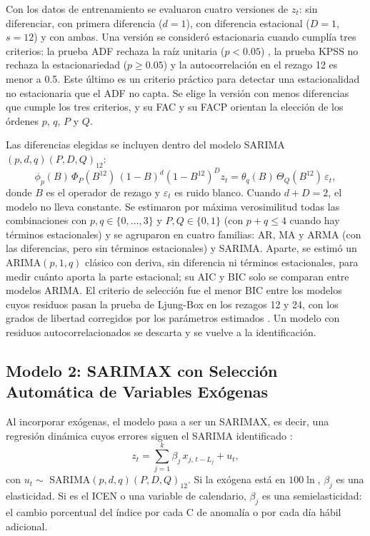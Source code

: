 \documentclass[conference]{IEEEtran}
\begin{document}
Con los datos de entrenamiento se evaluaron cuatro versiones de $z_t$: sin diferenciar, con primera diferencia ($d=1$), con diferencia estacional ($D=1$, $s=12$) y con ambas. Una versión se consideró estacionaria cuando cumplía tres criterios: la prueba ADF rechaza la raíz unitaria ($p<0.05$) \cite{dickey1979}, la prueba KPSS no rechaza la estacionariedad ($p\geq0.05$) \cite{kpss1992} y la autocorrelación en el rezago 12 es menor a 0.5. Este último es un criterio práctico para detectar una estacionalidad no estacionaria que el ADF no capta. Se elige la versión con menos diferencias que cumple los tres criterios, y su FAC y su FACP orientan la elección de los órdenes $p$, $q$, $P$ y $Q$.

Las diferencias elegidas se incluyen dentro del modelo SARIMA$(p,d,q)(P,D,Q)_{12}$:
\begin{equation}
\phi_p(B)\,\Phi_P(B^{12})\,(1-B)^{d}(1-B^{12})^{D} z_t = \theta_q(B)\,\Theta_Q(B^{12})\,\varepsilon_t,
\label{eq:sarima}
\end{equation}
donde $B$ es el operador de rezago y $\varepsilon_t$ es ruido blanco. Cuando $d+D=2$, el modelo no lleva constante. Se estimaron por máxima verosimilitud todas las combinaciones con $p,q\in\{0,\dots,3\}$ y $P,Q\in\{0,1\}$ (con $p+q\leq4$ cuando hay términos estacionales) y se agruparon en cuatro familias: AR, MA y ARMA (con las diferencias, pero sin términos estacionales) y SARIMA. Aparte, se estimó un ARIMA$(p,1,q)$ clásico con deriva, sin diferencia ni términos estacionales, para medir cuánto aporta la parte estacional; su AIC y BIC solo se comparan entre modelos ARIMA. El criterio de selección fue el menor BIC entre los modelos cuyos residuos pasan la prueba de Ljung-Box en los rezagos 12 y 24, con los grados de libertad corregidos por los parámetros estimados \cite{ljungbox1978}. Un modelo con residuos autocorrelacionados se descarta y se vuelve a la identificación.

\subsection{Modelo 2: SARIMAX con Selección Automática de Variables Exógenas}

Al incorporar exógenas, el modelo pasa a ser un SARIMAX, es decir, una regresión dinámica cuyos errores siguen el SARIMA identificado \cite{box2015,hyndman2021}:
\begin{equation}
z_t = \sum_{j=1}^{k} \beta_j\, x_{j,\,t-L_j} + u_t,
\label{eq:sarimax}
\end{equation}
con $u_t \sim$ SARIMA$(p,d,q)(P,D,Q)_{12}$. Si la exógena está en $100\ln$, $\beta_j$ es una elasticidad. Si es el ICEN o una variable de calendario, $\beta_j$ es una semielasticidad: el cambio porcentual del índice por cada \textdegree C de anomalía o por cada día hábil adicional.
\end{document}
